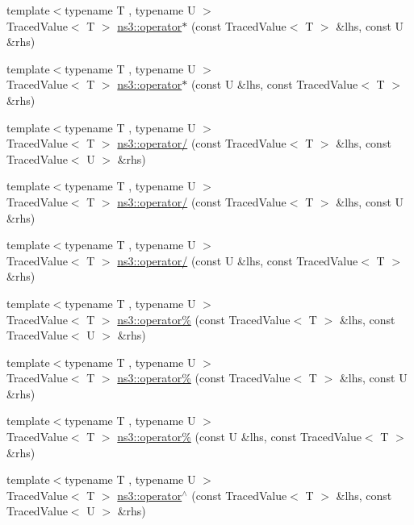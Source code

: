 \begin{DoxyCompactItemize}
\item 
{\footnotesize template$<$typename T , typename U $>$ }\\Traced\+Value$<$ T $>$ \hyperlink{group__tracing_ga735b4d1ce5c08bc715107f07ed933644}{ns3\+::operator$\ast$} (const Traced\+Value$<$ T $>$ \&lhs, const U \&rhs)
\item 
{\footnotesize template$<$typename T , typename U $>$ }\\Traced\+Value$<$ T $>$ \hyperlink{group__tracing_gac1cbedda6a22e93b898cc5b39e39e8da}{ns3\+::operator$\ast$} (const U \&lhs, const Traced\+Value$<$ T $>$ \&rhs)
\item 
{\footnotesize template$<$typename T , typename U $>$ }\\Traced\+Value$<$ T $>$ \hyperlink{group__tracing_ga5aa99ab0ba1592361e452c73ed91bc52}{ns3\+::operator/} (const Traced\+Value$<$ T $>$ \&lhs, const Traced\+Value$<$ U $>$ \&rhs)
\item 
{\footnotesize template$<$typename T , typename U $>$ }\\Traced\+Value$<$ T $>$ \hyperlink{group__tracing_ga22c4905dee035bcbbf03190562a01bca}{ns3\+::operator/} (const Traced\+Value$<$ T $>$ \&lhs, const U \&rhs)
\item 
{\footnotesize template$<$typename T , typename U $>$ }\\Traced\+Value$<$ T $>$ \hyperlink{group__tracing_ga20d493bf5e7b5d846f8dd3523656e2f2}{ns3\+::operator/} (const U \&lhs, const Traced\+Value$<$ T $>$ \&rhs)
\item 
{\footnotesize template$<$typename T , typename U $>$ }\\Traced\+Value$<$ T $>$ \hyperlink{group__tracing_ga9c7af7eff88594d6a21e1639c9178e32}{ns3\+::operator\%} (const Traced\+Value$<$ T $>$ \&lhs, const Traced\+Value$<$ U $>$ \&rhs)
\item 
{\footnotesize template$<$typename T , typename U $>$ }\\Traced\+Value$<$ T $>$ \hyperlink{group__tracing_ga885007c6a30f0c682373cd46119700c2}{ns3\+::operator\%} (const Traced\+Value$<$ T $>$ \&lhs, const U \&rhs)
\item 
{\footnotesize template$<$typename T , typename U $>$ }\\Traced\+Value$<$ T $>$ \hyperlink{group__tracing_ga225d35406003f51f61f227582b00b77a}{ns3\+::operator\%} (const U \&lhs, const Traced\+Value$<$ T $>$ \&rhs)
\item 
{\footnotesize template$<$typename T , typename U $>$ }\\Traced\+Value$<$ T $>$ \hyperlink{group__tracing_gae26a80fbd89c38b3c155db08c34200e0}{ns3\+::operator$^\wedge$} (const Traced\+Value$<$ T $>$ \&lhs, const Traced\+Value$<$ U $>$ \&rhs)

\end{DoxyCompactItemize}
